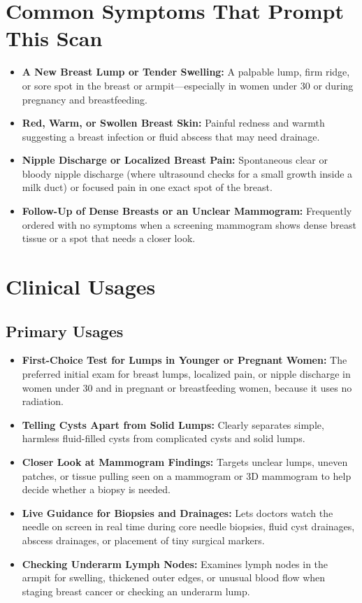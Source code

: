 \section{Common Symptoms That Prompt This Scan}
\begin{itemize}
\item \textbf{A New Breast Lump or Tender Swelling:} A palpable lump, firm ridge, or sore spot in the breast or armpit---especially in women under 30 or during pregnancy and breastfeeding.
\item \textbf{Red, Warm, or Swollen Breast Skin:} Painful redness and warmth suggesting a breast infection or fluid abscess that may need drainage.
\item \textbf{Nipple Discharge or Localized Breast Pain:} Spontaneous clear or bloody nipple discharge (where ultrasound checks for a small growth inside a milk duct) or focused pain in one exact spot of the breast.
\item \textbf{Follow-Up of Dense Breasts or an Unclear Mammogram:} Frequently ordered with no symptoms when a screening mammogram shows dense breast tissue or a spot that needs a closer look.
\end{itemize}

\section{Clinical Usages}

\subsection{Primary Usages}
\begin{itemize}
\item \textbf{First-Choice Test for Lumps in Younger or Pregnant Women:} The preferred initial exam for breast lumps, localized pain, or nipple discharge in women under 30 and in pregnant or breastfeeding women, because it uses no radiation.
\item \textbf{Telling Cysts Apart from Solid Lumps:} Clearly separates simple, harmless fluid-filled cysts from complicated cysts and solid lumps.
\item \textbf{Closer Look at Mammogram Findings:} Targets unclear lumps, uneven patches, or tissue pulling seen on a mammogram or 3D mammogram to help decide whether a biopsy is needed.
\item \textbf{Live Guidance for Biopsies and Drainages:} Lets doctors watch the needle on screen in real time during core needle biopsies, fluid cyst drainages, abscess drainages, or placement of tiny surgical markers.
\item \textbf{Checking Underarm Lymph Nodes:} Examines lymph nodes in the armpit for swelling, thickened outer edges, or unusual blood flow when staging breast cancer or checking an underarm lump.
\end{itemize}

